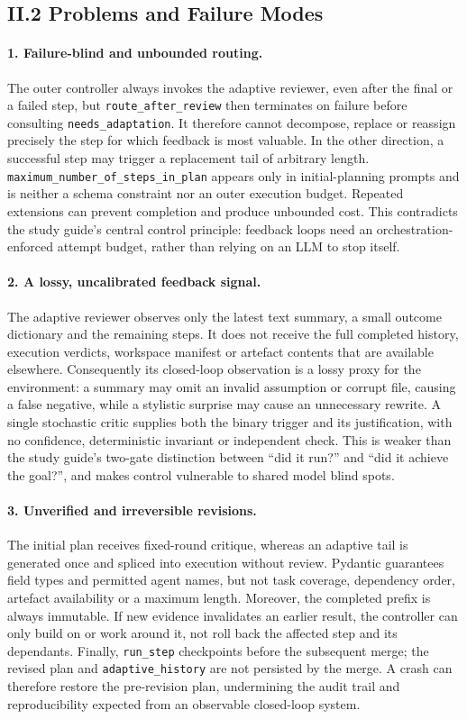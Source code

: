 \subsection{II.2 Problems and Failure Modes}

\paragraph{1. Failure-blind and unbounded routing.}
The outer controller always invokes the adaptive reviewer, even after the final
or a failed step, but \texttt{route\_after\_review} then terminates on failure
before consulting \texttt{needs\_adaptation}. It therefore cannot
decompose, replace or reassign precisely the step for which feedback is most
valuable. In the other direction, a successful step may trigger a replacement
tail of arbitrary length. \texttt{maximum\_number\_of\_steps\_in\_plan} appears
only in initial-planning prompts and is neither a schema constraint nor an outer
execution budget. Repeated extensions can prevent completion and produce
unbounded cost. This contradicts the study guide's central control principle:
feedback loops need an orchestration-enforced attempt budget, rather than relying
on an LLM to stop itself.

\paragraph{2. A lossy, uncalibrated feedback signal.}
The adaptive reviewer observes only the latest text summary, a small outcome
dictionary and the remaining steps. It does not receive the full completed
history, execution verdicts, workspace manifest or artefact contents that are
available elsewhere. Consequently its closed-loop observation is a lossy proxy
for the environment: a summary may omit an invalid assumption or corrupt file,
causing a false negative, while a stylistic surprise may cause an unnecessary
rewrite. A single stochastic critic supplies both the binary trigger and its
justification, with no confidence, deterministic invariant or independent check.
This is weaker than the study guide's two-gate distinction between ``did it run?''
and ``did it achieve the goal?'', and makes control vulnerable to shared model
blind spots.

\paragraph{3. Unverified and irreversible revisions.}
The initial plan receives fixed-round critique, whereas an adaptive tail is
generated once and spliced into execution without review. Pydantic guarantees
field types and permitted agent names, but not task coverage, dependency order,
artefact availability or a maximum length. Moreover, the completed prefix is
always immutable. If new evidence invalidates an earlier result, the controller
can only build on or work around it, not roll back the affected step and its
dependants. Finally, \texttt{run\_step} checkpoints before the subsequent merge;
the revised plan and \texttt{adaptive\_history} are not persisted by the merge.
A crash can therefore restore the pre-revision plan, undermining the audit trail
and reproducibility expected from an observable closed-loop system.
